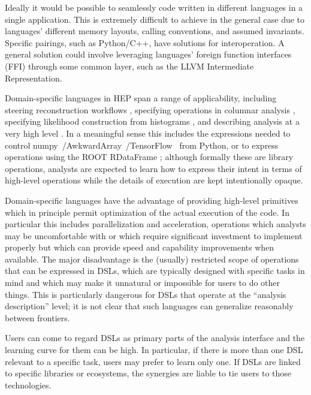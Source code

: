 Ideally it would be possible to seamlessly code written in different languages in a single application. This is extremely difficult to achieve in the general case due to languages' different memory layouts, calling conventions, and assumed invariants. Specific pairings, such as Python/C++, have solutions for interoperation. A general solution could involve leveraging languages' foreign function interfaces (FFI) through some common layer, such as the LLVM \cite{LLVM:CGO04} Intermediate Representation.

Domain-specific languages in HEP span a range of applicability, including steering reconstruction workflows \cite{Bennett:2022gyi}, specifying operations in columnar analysis \cite{Proffitt:2021wfh}, specifying likelihood construction from histograms \cite{TRexFitter}, and describing analysis at a very high level \cite{Prosper:2022lnf}. In a meaningful sense this includes the expressions needed to control numpy~\cite{harris2020array}/AwkwardArray~\cite{jim_pivarski_2020_3952674}/TensorFlow~\cite{tensorflow_developers_2022_6574269} from Python, or to express operations using the ROOT RDataFrame \cite{Piparo:2019xdy}; although formally these are library operations, analysts are expected to learn how to express their intent in terms of high-level operations while the details of execution are kept intentionally opaque. 

Domain-specific languages have the advantage of providing high-level primitives which in principle permit optimization of the actual execution of the code. In particular this includes parallelization and acceleration, operations which analysts may be uncomfortable with or which require significant investment to implement properly but which can provide speed and capability improvements when available. The major disadvantage is the (usually) restricted scope of operations that can be expressed in DSLs, which are typically designed with specific tasks in mind and which may make it unnatural or impossible for users to do other things. This is particularly dangerous for DSLs that operate at the ``analysis description'' level; it is not clear that such languages can generalize reasonably between frontiers.

Users can come to regard DSLs as primary parts of the analysis interface and the learning curve for them can be high. In particular, if there is more than one DSL relevant to a specific task, users may prefer to learn only one. If DSLs are linked to specific libraries or ecosystems, the synergies are liable to tie users to those technologies.

